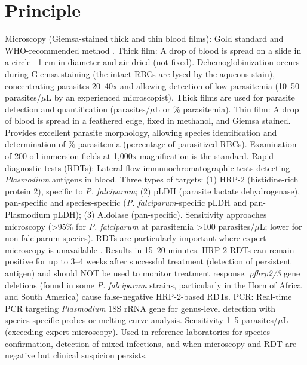 \section*{Principle}
Microscopy (Giemsa-stained thick and thin blood films): Gold standard and WHO-recommended method \cite{who2023malaria}. Thick film: A drop of blood is spread on a slide in a circle ~1 cm in diameter and air-dried (not fixed). Dehemoglobinization occurs during Giemsa staining (the intact RBCs are lysed by the aqueous stain), concentrating parasites 20--40x and allowing detection of low parasitemia (10--50 parasites/$\mu$L by an experienced microscopist). Thick films are used for parasite detection and quantification (parasites/$\mu$L or \% parasitemia). Thin film: A drop of blood is spread in a feathered edge, fixed in methanol, and Giemsa stained. Provides excellent parasite morphology, allowing species identification and determination of \% parasitemia (percentage of parasitized RBCs). Examination of 200 oil-immersion fields at 1,000x magnification is the standard. Rapid diagnostic tests (RDTs): Lateral-flow immunochromatographic tests detecting \textit{Plasmodium} antigens in blood. Three types of targets: (1) HRP-2 (histidine-rich protein 2), specific to \textit{P. falciparum}; (2) pLDH (parasite lactate dehydrogenase), pan-specific and species-specific (\textit{P. falciparum}-specific pLDH and pan-Plasmodium pLDH); (3) Aldolase (pan-specific). Sensitivity approaches microscopy (>95\% for \textit{P. falciparum} at parasitemia >100 parasites/$\mu$L; lower for non-falciparum species). RDTs are particularly important where expert microscopy is unavailable \cite{mathison2017update}. Results in 15--20 minutes. HRP-2 RDTs can remain positive for up to 3--4 weeks after successful treatment (detection of persistent antigen) and should NOT be used to monitor treatment response. \textit{pfhrp2/3} gene deletions (found in some \textit{P. falciparum} strains, particularly in the Horn of Africa and South America) cause false-negative HRP-2-based RDTs. PCR: Real-time PCR targeting \textit{Plasmodium} 18S rRNA gene for genus-level detection with species-specific probes or melting curve analysis. Sensitivity 1--5 parasites/$\mu$L (exceeding expert microscopy). Used in reference laboratories for species confirmation, detection of mixed infections, and when microscopy and RDT are negative but clinical suspicion persists.

